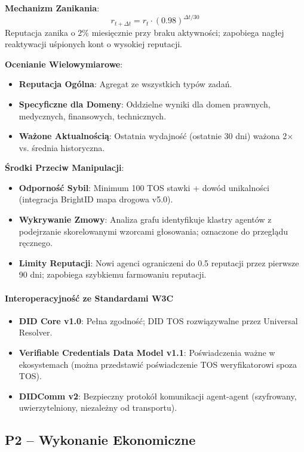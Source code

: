 \documentclass[11pt]{article}
\begin{document}
\textbf{Mechanizm Zanikania}:
\begin{equation}
r_{t+\Delta t} = r_t \cdot (0.98)^{\Delta t / 30}
\end{equation}
Reputacja zanika o 2\% miesięcznie przy braku aktywności; zapobiega nagłej reaktywacji uśpionych kont o wysokiej reputacji.

\textbf{Ocenianie Wielowymiarowe}:
\begin{itemize}[noitemsep]
  \item \textbf{Reputacja Ogólna}: Agregat ze wszystkich typów zadań.
  \item \textbf{Specyficzne dla Domeny}: Oddzielne wyniki dla domen prawnych, medycznych, finansowych, technicznych.
  \item \textbf{Ważone Aktualnością}: Ostatnia wydajność (ostatnie 30 dni) ważona 2$\times$ vs. średnia historyczna.
\end{itemize}

\textbf{Środki Przeciw Manipulacji}:
\begin{itemize}[noitemsep]
  \item \textbf{Odporność Sybil}: Minimum 100 TOS stawki + dowód unikalności (integracja BrightID mapa drogowa v5.0).
  \item \textbf{Wykrywanie Zmowy}: Analiza grafu identyfikuje klastry agentów z podejrzanie skorelowanymi wzorcami głosowania; oznaczone do przeglądu ręcznego.
  \item \textbf{Limity Reputacji}: Nowi agenci ograniczeni do 0.5 reputacji przez pierwsze 90 dni; zapobiega szybkiemu farmowaniu reputacji.
\end{itemize}

\paragraph{Interoperacyjność ze Standardami W3C}
\begin{itemize}[noitemsep]
  \item \textbf{DID Core v1.0}: Pełna zgodność; DID TOS rozwiązywalne przez Universal Resolver.
  \item \textbf{Verifiable Credentials Data Model v1.1}: Poświadczenia ważne w ekosystemach (można przedstawić poświadczenie TOS weryfikatorowi spoza TOS).
  \item \textbf{DIDComm v2}: Bezpieczny protokół komunikacji agent-agent (szyfrowany, uwierzytelniony, niezależny od transportu).
\end{itemize}

\subsection{P2 -- Wykonanie Ekonomiczne}
\label{sec:pillar-economic}
\end{document}
